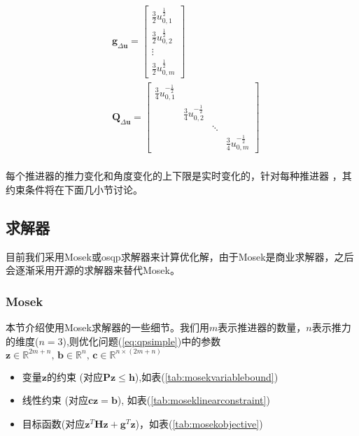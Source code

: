 \begin{equation}
  \label{eq:qpsimple2}
  \begin{aligned}
    &\bm{g}_{\Delta \bm{u}}=
    \begin{bmatrix}
      \frac{3}{2} u_{0,1}^{\frac{1}{2}} \\
      \frac{3}{2} u_{0,2}^{\frac{1}{2}} \\
      \vdots \\
      \frac{3}{2} u_{0, m}^{\frac{1}{2}}
    \end{bmatrix} \\
    & \bm{Q}_{\Delta \bm{u}} =
    \begin{bmatrix}
      \frac{3}{4} u_{0,1}^{-\frac{1}{2}} & & & \\
      & \frac{3}{4} u_{0,2}^{-\frac{1}{2}} & & \\
      & & \ddots & \\
      & & & \frac{3}{4} u_{0,m}^{-\frac{1}{2}}
    \end{bmatrix} \\
  \end{aligned}
\end{equation}


每个推进器的推力变化和角度变化的上下限是实时变化的，针对每种推进器
，其约束条件将在下面几小节讨论。


\subsection{求解器}
目前我们采用Mosek或osqp求解器来计算优化解，由于Mosek是商业求解器，之后会逐渐采用开源的求解器来替代Mosek。

\subsubsection{Mosek}
本节介绍使用Mosek求解器的一些细节。我们用$m$表示推进器的数量，$n$表示推力的维度($n=3$),则优化问题(\ref{eq:qpsimple})中的参数
$ \bm{z} \in \mathbb{R}^{2 m + n} , \, \bm{b} \in \mathbb{R}^{n} , \, \bm{c} \in 
\mathbb{R}^{{n}\times (2m+n)}$

\begin{itemize}
  \item 变量$ \bm{z}$的约束 (对应$\bm{Pz \leq h}$),如表(\ref{tab:mosekvariablebound})

  \item 线性约束 (对应$\bm{cz = b}$), 如表(\ref{tab:moseklinearconstraint})

  \item 目标函数(对应$\bm{z}^{T} \bm{H} \bm{z}+\bm{g}^{T} \bm{z}$)，如表(\ref{tab:mosekobjective})
\end{itemize}

